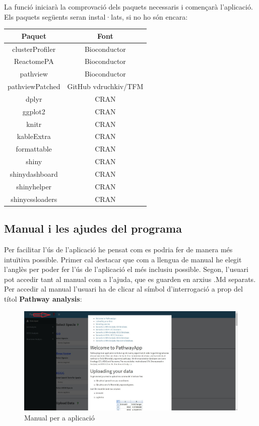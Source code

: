 \documentclass[]{article}
\begin{document}
La funció  iniciarà la comprovació dels paquets necessaris i començarà l'aplicació. Els paquets següents seran instal·lats, si no ho són encara:

\begin{center}
\begin{tabular}{||c | c ||} 
\hline\hline 
\textbf{Paquet} & \textbf{Font} \\ [0.5ex] 
\hline\hline
clusterProfiler & Bioconductor \\
\hline
ReactomePA & Bioconductor \\
\hline
pathview & Bioconductor \\ 
\hline
pathviewPatched & GitHub vdruchkiv/TFM\\
\hline
dplyr & CRAN \\
\hline 
ggplot2 & CRAN \\
\hline
knitr & CRAN \\
\hline
kableExtra & CRAN \\
\hline
formattable & CRAN \\
\hline
shiny & CRAN \\
\hline 
shinydashboard & CRAN \\ 
\hline
shinyhelper & CRAN \\
\hline 
shinycssloaders & CRAN\\
\hline\hline
\end{tabular}
\end{center}

\subsection{Manual i les ajudes del programa}

Per facilitar l'ús de l’aplicació he pensat com es podria fer de manera més intuïtiva possible. Primer cal destacar que com a llengua de manual he elegit l’anglès per poder fer l'ús de l'aplicació el més inclusiu possible. Segon, l'usuari pot accedir tant al manual com a l'ajuda, que es guarden en arxius .Md separats. Per accedir al manual l'usuari ha de clicar al símbol d’interrogació a prop del títol \textbf{Pathway analysis}:
\begin{figure}[H]
\centering
\includegraphics[width=1\textwidth]{Manual.jpg} 
\caption{Manual per a aplicació}
\end{figure}
\end{document}
